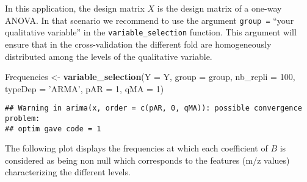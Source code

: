 \documentclass[]{article}
\newenvironment{Shaded}{\begin{snugshade}}{\end{snugshade}}
\newcommand{\KeywordTok}[1]{\textcolor[rgb]{0.13,0.29,0.53}{\textbf{#1}}}
\newcommand{\DataTypeTok}[1]{\textcolor[rgb]{0.13,0.29,0.53}{#1}}
\newcommand{\DecValTok}[1]{\textcolor[rgb]{0.00,0.00,0.81}{#1}}
\newcommand{\FloatTok}[1]{\textcolor[rgb]{0.00,0.00,0.81}{#1}}
\newcommand{\StringTok}[1]{\textcolor[rgb]{0.31,0.60,0.02}{#1}}
\newcommand{\OperatorTok}[1]{\textcolor[rgb]{0.81,0.36,0.00}{\textbf{#1}}}
\newcommand{\NormalTok}[1]{#1}
\begin{document}
In this application, the design matrix \(X\) is the design matrix of a
one-way ANOVA. In that scenario we recommend to use the argument
\texttt{group =} ``your qualitative variable'' in the
\texttt{variable_selection} function. This argument will ensure that in
the cross-validation the different fold are homogeneously distributed
among the levels of the qualitative variable.

\begin{Shaded}
\begin{Highlighting}[]
\NormalTok{Frequencies <-}\StringTok{ }\KeywordTok{variable_selection}\NormalTok{(}\DataTypeTok{Y =}\NormalTok{ Y, }\DataTypeTok{group =}\NormalTok{ group, }\DataTypeTok{nb_repli =} \DecValTok{100}\NormalTok{, }\DataTypeTok{typeDep =} \StringTok{'ARMA'}\NormalTok{, }\DataTypeTok{pAR =} \DecValTok{1}\NormalTok{, }\DataTypeTok{qMA =} \DecValTok{1}\NormalTok{)}
\end{Highlighting}
\end{Shaded}

\begin{verbatim}
## Warning in arima(x, order = c(pAR, 0, qMA)): possible convergence problem:
## optim gave code = 1
\end{verbatim}

The following plot displays the frequencies at which each coefficient of
\(B\) is considered as being non null which corresponds to the features
(m/z values) characterizing the different levels.

\begin{Shaded}
\end{Shaded}
\end{document}
